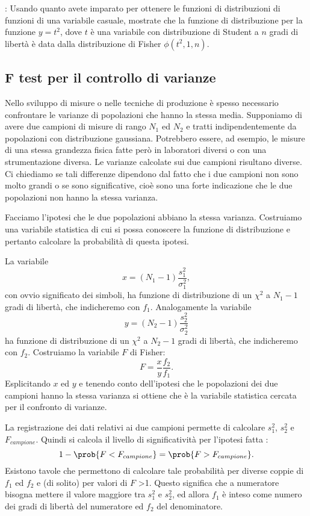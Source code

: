  : Usando quanto avete imparato per ottenere
le funzioni di distribuzioni di funzioni
di una variabile casuale, mostrate che la funzione di distribuzione
per la funzione $y=t^2$, dove $t$ \`e una variabile con distribuzione
di Student a $n$ gradi di libert\`a \`e data dalla distribuzione di
Fisher $\phi(t^2,1,n)$.

\subsection{F test per il controllo di varianze}
Nello sviluppo di misure o nelle tecniche di produzione \`e spesso
necessario confrontare le varianze di popolazioni che hanno la stessa media.
Supponiamo di avere due campioni di misure di rango $N_1$ ed $N_2$ e
tratti indipendentemente da popolazioni con distribuzione
gaussiana. Potrebbero essere, ad esempio, le misure di una stessa
grandezza fisica fatte per\`o in laboratori diversi o con una
strumentazione diversa. Le varianze calcolate sui due campioni
risultano diverse. Ci chiediamo se tali differenze dipendono dal
fatto che i due campioni non sono molto grandi o se sono
significative, cio\`e sono una forte indicazione che le due
popolazioni non hanno la stessa varianza.

\noindent Facciamo l'ipotesi che le due popolazioni abbiano la stessa
varianza. Costruiamo una variabile statistica di cui si possa
conoscere la funzione di distribuzione e pertanto
calcolare la probabilit\`a di questa ipotesi.

\noindent La variabile
$$x=(N_1-1)\frac{s_1^2}{\sigma_1^2}, $$
con ovvio significato dei simboli,
ha funzione di distribuzione di un $\chi^2$ a $N_1-1$ gradi di
libert\`a, che  indicheremo con $f_1$. Analogamente la variabile
$$y= (N_2-1)\frac{s_2^2}{\sigma_2^2}$$
ha funzione di distribuzione di un $\chi^2$ a $N_2-1$ gradi di
libert\`a, che  indicheremo con $f_2$. Costruiamo la
variabile $F$ di Fisher:
$$F= \frac{x}{y}\frac{f_2}{f_1}.$$
Esplicitando $x$ ed $y$ e tenendo conto dell'ipotesi che le
popolazioni dei due campioni hanno la stessa varianza si ottiene
che \`e la variabile statistica cercata per il confronto di varianze.

\noindent La registrazione dei dati relativi ai due campioni permette
di calcolare $s_1^2$, $s_2^2$ e  $F_{campione}$.
Quindi si calcola il livello di significativit\`a per l'ipotesi fatta :
$$1 - \prob{F < F_{campione}} = \prob{F > F_{campione}}.$$
Esistono tavole che permettono di calcolare tale probabilit\`a per
diverse coppie di $f_1$ ed $f_2$ e (di solito) per valori di $F$
>1. Questo significa che a numeratore bisogna mettere il valore
maggiore tra $s_1^2$ e $s_2^2$, ed allora $f_1$ \`e inteso come numero
dei gradi di libert\`a del numeratore ed $f_2$ del denominatore.

